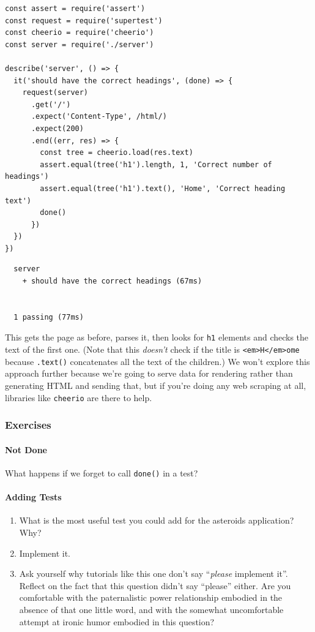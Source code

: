 \begin{verbatim}
const assert = require('assert')
const request = require('supertest')
const cheerio = require('cheerio')
const server = require('./server')

describe('server', () => {
  it('should have the correct headings', (done) => {
    request(server)
      .get('/')
      .expect('Content-Type', /html/)
      .expect(200)
      .end((err, res) => {
        const tree = cheerio.load(res.text)
        assert.equal(tree('h1').length, 1, 'Correct number of headings')
        assert.equal(tree('h1').text(), 'Home', 'Correct heading text')
        done()
      })
  })
})
\end{verbatim}

\begin{verbatim}
  server
    + should have the correct headings (67ms)


  1 passing (77ms)
\end{verbatim}

This gets the page as before, parses it, then looks for \texttt{h1}
elements and checks the text of the first one. (Note that this
\emph{doesn't} check if the title is
\texttt{\textless{}em\textgreater{}H\textless{}/em\textgreater{}ome}
because \texttt{.text()} concatenates all the text of the children.) We
won't explore this approach further because we're going to serve data
for rendering rather than generating HTML and sending that, but if
you're doing any web scraping at all, libraries like \texttt{cheerio}
are there to help.

\subsubsection{Exercises}\label{s:testing-exercises}

\paragraph{Not Done}\label{not-done}

What happens if we forget to call \texttt{done()} in a test?

\paragraph{Adding Tests}\label{adding-tests}

\begin{enumerate}
\tightlist
\item
  What is the most useful test you could add for the asteroids
  application? Why?
\item
  Implement it.
\item
  Ask yourself why tutorials like this one don't say ``\emph{please}
  implement it''. Reflect on the fact that this question didn't say
  ``please'' either. Are you comfortable with the paternalistic power
  relationship embodied in the absence of that one little word, and with
  the somewhat uncomfortable attempt at ironic humor embodied in this
  question?
\end{enumerate}

